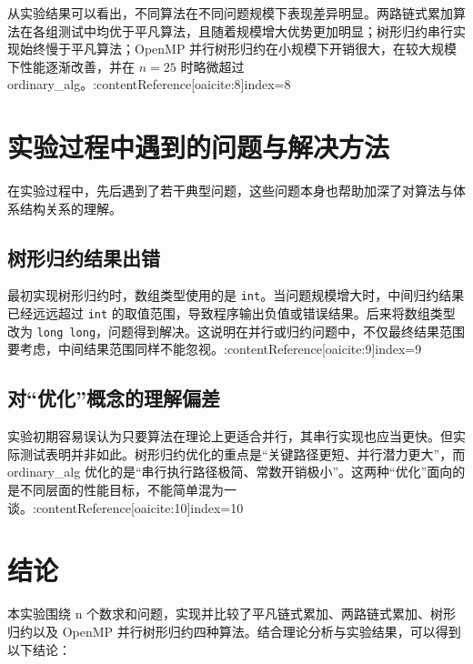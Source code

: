 \documentclass[a4paper,12pt]{ctexart}
\begin{document}
从实验结果可以看出，不同算法在不同问题规模下表现差异明显。两路链式累加算法在各组测试中均优于平凡算法，且随着规模增大优势更加明显；树形归约串行实现始终慢于平凡算法；OpenMP 并行树形归约在小规模下开销很大，在较大规模下性能逐渐改善，并在 $n=25$ 时略微超过 ordinary\_alg。:contentReference[oaicite:8]{index=8}

\section{实验过程中遇到的问题与解决方法}

在实验过程中，先后遇到了若干典型问题，这些问题本身也帮助加深了对算法与体系结构关系的理解。

\subsection{树形归约结果出错}

最初实现树形归约时，数组类型使用的是 \texttt{int}。当问题规模增大时，中间归约结果已经远远超过 \texttt{int} 的取值范围，导致程序输出负值或错误结果。后来将数组类型改为 \texttt{long long}，问题得到解决。这说明在并行或归约问题中，不仅最终结果范围要考虑，中间结果范围同样不能忽视。:contentReference[oaicite:9]{index=9}

\subsection{对“优化”概念的理解偏差}

实验初期容易误认为只要算法在理论上更适合并行，其串行实现也应当更快。但实际测试表明并非如此。树形归约优化的重点是“关键路径更短、并行潜力更大”，而 ordinary\_alg 优化的是“串行执行路径极简、常数开销极小”。这两种“优化”面向的是不同层面的性能目标，不能简单混为一谈。:contentReference[oaicite:10]{index=10}

\section{结论}

本实验围绕 n 个数求和问题，实现并比较了平凡链式累加、两路链式累加、树形归约以及 OpenMP 并行树形归约四种算法。结合理论分析与实验结果，可以得到以下结论：
\end{document}
